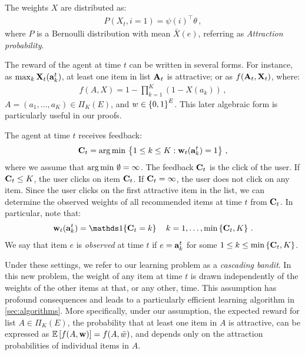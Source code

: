 \begin{assumption}
\label{ass:independence} The weights $X$ are distributed as:
\begin{align*}
  P(X_t,i = 1) = \psi(i)^\top \theta \,,
\end{align*}
where $P$ is a Bernoulli distribution with mean $\bar{X}(e)$, referring as \emph{Attraction probability}.
\end{assumption}

The reward of the agent at time $t$ can be written in several forms. For instance, as $\max_k \mathbf{X}_t(\mathbf{a}^t_k)$, at least one item in list $\mathbf{A}_t$ is attractive; or as $f(\mathbf{A}_t, \mathbf{X}_t)$, where:
\begin{align*}
  f(A, X) = 1 - \prod_{k = 1}^K (1 - X(a_k))\,,
\end{align*}
$A = (a_1, \dots, a_K) \in \Pi_K(E)$, and $w \in \left\{0, 1\right\}^E$. This later algebraic form is particularly useful in our proofs.

The agent at time $t$ receives feedback:
\begin{align*}
  \mathbf{C}_t = \operatorname*{arg\,min\,} \left\{1 \leq k \leq K: \mathbf{w}_t(\mathbf{a}^t_k) = 1\right\}\,,
\end{align*}
where we assume that $\operatorname*{arg\,min\,} \emptyset = \infty$. The feedback $\mathbf{C}_t$ is the click of the user. If $\mathbf{C}_t \leq K$, the user clicks on item $\mathbf{C}_t$. If $\mathbf{C}_t = \infty$, the user does not click on any item. Since the user clicks on the first attractive item in the list, we can determine the observed weights of all recommended items at time $t$ from $\mathbf{C}_t$. In particular, note that:
\begin{align}
  \rnd{w}_t(\rnd{a}^t_k) = \I{\rnd{C}_t = k} \quad k = 1, \dots, \min \set{\rnd{C}_t, K}\,.
  \label{eq:click}
\end{align}
We say that item $e$ is \emph{observed} at time $t$ if $e = \mathbf{a}^t_k$ for some $1 \leq k \leq \min \left\{\mathbf{C}_t, K\right\}$.

Under these settings, we refer to our learning problem as a \emph{cascading bandit}. In this new problem, the weight of any item at time $t$ is drawn independently of the weights of the other items at that, or any other, time. This assumption has profound consequences and leads to a particularly efficient learning algorithm in \cref{sec:algorithms}. More specifically, under our assumption, the expected reward for list $A \in \Pi_K(E)$, the probability that at least one item in $A$ is attractive, can be expressed as $\mathbb{E} \left[f(A, \mathbf{w})\right] = f(A, \bar{w})$, and depends only on the attraction probabilities of individual items in $A$.

